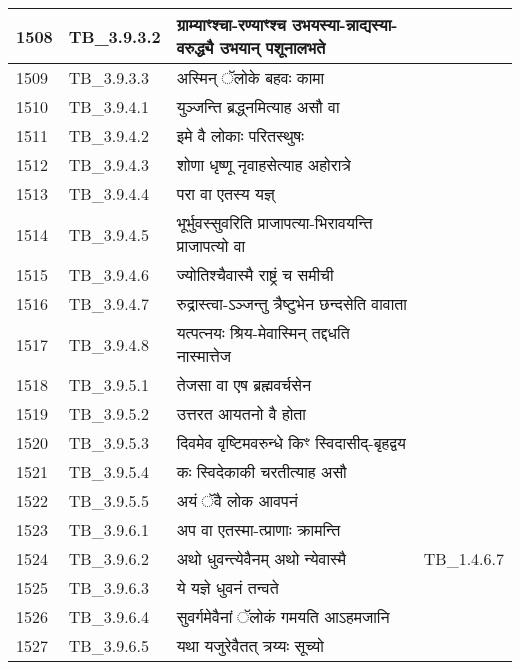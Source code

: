 \documentclass[17pt]{extarticle}
\begin{document}
\begin{longtable}{||p{0.4in}||p{0.9in}||p{4.0in}||p{0.9in}||}
        \hline
            1508 & TB\_3.9.3.2 & ग्राम्याꣳश्चा{-}रण्याꣳश्च उभयस्या{-}न्नाद्यस्या{-}वरुद्ध्यै उभयान् पशूनालभते &      \\
        \hline
            1509 & TB\_3.9.3.3 & अस्मिन् ॅलोके बहवः कामा &      \\
        \hline
            1510 & TB\_3.9.4.1 & युञ्जन्ति ब्रद्ध्नमित्याह असौ वा &      \\
        \hline
            1511 & TB\_3.9.4.2 & इमे वै लोकाः परितस्थुषः &      \\
        \hline
            1512 & TB\_3.9.4.3 & शोणा धृष्णू नृवाहसेत्याह अहोरात्रे &      \\
        \hline
            1513 & TB\_3.9.4.4 & परा वा एतस्य यज्ञ् &      \\
        \hline
            1514 & TB\_3.9.4.5 & भूर्भुवस्सुवरिति प्राजापत्या{-}भिरावयन्ति प्राजापत्यो वा &      \\
        \hline
            1515 & TB\_3.9.4.6 & ज्योतिश्चैवास्मै राष्ट्रं च समीची &      \\
        \hline
            1516 & TB\_3.9.4.7 & रुद्रास्त्वा{-}ऽञ्जन्तु त्रैष्टुभेन छन्दसेति वावाता &      \\
        \hline
            1517 & TB\_3.9.4.8 & यत्पत्नयः श्रिय{-}मेवास्मिन् तद्दधति नास्मात्तेज &      \\
        \hline
            1518 & TB\_3.9.5.1 & तेजसा वा एष ब्रह्मवर्चसेन &      \\
        \hline
            1519 & TB\_3.9.5.2 & उत्तरत आयतनो वै होता &      \\
        \hline
            1520 & TB\_3.9.5.3 & दिवमेव वृष्टिमवरुन्धे किꣳ स्विदासीद्{-}बृहद्वय &      \\
        \hline
            1521 & TB\_3.9.5.4 & कः स्विदेकाकी चरतीत्याह असौ &      \\
        \hline
            1522 & TB\_3.9.5.5 & अयं ॅवै लोक आवपनं &      \\
        \hline
            1523 & TB\_3.9.6.1 & अप वा एतस्मा{-}त्प्राणाः क्रामन्ति &      \\
        \hline
            1524 & TB\_3.9.6.2 & अथो धुवन्त्येवैनम् अथो न्येवास्मै & TB\_1.4.6.7        \\
        \hline
            1525 & TB\_3.9.6.3 & ये यज्ञे धुवनं तन्वते &      \\
        \hline
            1526 & TB\_3.9.6.4 & सुवर्गमेवैनां ॅलोकं गमयति आऽहमजानि &      \\
        \hline
            1527 & TB\_3.9.6.5 & यथा यजुरेवैतत् त्रय्यः सूच्यो &      \\

\end{longtable}
\end{document}
